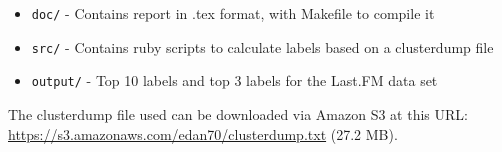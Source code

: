 \documentclass[letterpaper, 10 pt, conference]{ieeeconf}
\begin{document}
\begin{itemize}
 \item \texttt{doc/} - Contains report in .tex format, with Makefile to compile
 it
 \item \texttt{src/} - Contains ruby scripts to calculate labels based on a
 clusterdump file
 \item \texttt{output/} - Top 10 labels and top 3 labels for the Last.FM data
 set
\end{itemize}

The clusterdump file used can be downloaded via Amazon S3 at this URL:
\url{https://s3.amazonaws.com/edan70/clusterdump.txt} (27.2 MB).

{}

\end{document}
